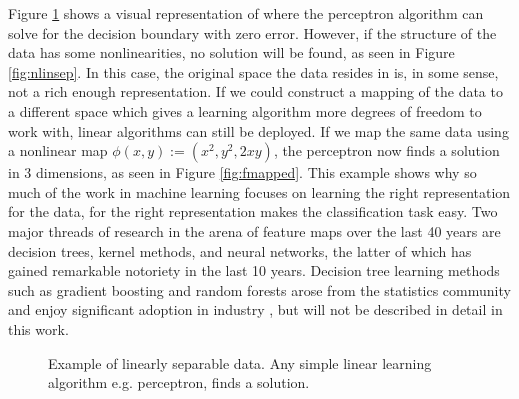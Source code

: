 Figure \ref{fig:linsep} shows a visual representation of where the perceptron algorithm can solve for the decision boundary with zero error. 
However, if the structure of the data has some nonlinearities, no solution will be found, as seen in Figure \ref{fig:nlinsep}. In this case,
the original space the data resides in is, in some sense, not a rich enough representation. If we could construct a mapping of the data to a
different space which gives a learning algorithm more degrees of freedom to work with, linear algorithms can still be deployed. 
If we map the same data using a nonlinear map $\phi(x,y):= (x^2, y^2, 2xy)$, the perceptron now finds a solution
in 3 dimensions, as seen in Figure \ref{fig:fmapped}. This example shows why so much of the work in machine learning focuses on 
learning the right representation for the data, for the right representation makes the classification task easy. Two major threads of 
research in the arena of feature maps over the last 40 years are decision trees, kernel methods, and neural networks, the latter
of which has gained remarkable notoriety in the last 10 years. Decision tree learning methods such as gradient boosting and random forests
arose from the statistics community and enjoy significant adoption in industry \cite{Wasserman}, but will not be described in detail in this work.  

\begin{figure}\label{fig:linsep}
\centering
    \caption{Example of linearly separable data. Any simple linear learning algorithm e.g. perceptron, finds a solution.}
    \label{fig:linsep}
\end{figure} 

